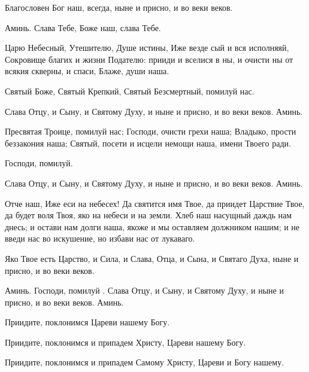 

\label{_content_chasi-tretiy-shestoy}

\begin{mymulticols}
 


 Благословен Бог наш, всегда, ныне и присно, и во веки веков.

 Аминь. Слава Тебе, Боже наш, слава Тебе.



Царю Небесный, Утешителю, Душе истины, Иже везде сый и вся исполняяй, Сокровище благих и жизни Подателю: прииди и вселися в ны, и очисти ны от всякия скверны, и спаси, Блаже, души наша.



Святый Боже, Святый Крепкий, Святый Безсмертный, помилуй нас.

Слава Отцу, и Сыну, и Святому Духу, и ныне и присно, и во веки веков. Аминь.



Пресвятая Троице, помилуй нас; Господи, очисти грехи наша; Владыко, прости беззакония наша; Святый, посети и исцели немощи наша, имени Твоего ради.



Господи, помилуй.

Слава Отцу, и Сыну, и Святому Духу, и ныне и присно, и во веки веков. Аминь.

Отче наш, Иже еси на небесех! Да святится имя Твое, да приидет Царствие Твое, да будет воля Твоя, яко на небеси и на земли. Хлеб наш насущный даждь нам днесь; и остави нам долги наша, якоже и мы оставляем должником нашим; и не введи нас во искушение, но избави нас от лукаваго.

 Яко Твое есть Царство, и Сила, и Слава, Отца, и Сына, и Святаго Духа, ныне и присно, и во веки веков.

 Аминь. Господи, помилуй . Слава Отцу, и Сыну, и Святому Духу, и ныне и присно, и во веки веков. Аминь.

Приидите, поклонимся Цареви нашему Богу.

Приидите, поклонимся и припадем Христу, Цареви нашему Богу.

Приидите, поклонимся и припадем Самому Христу, Цареви и Богу нашему.




\end{mymulticols}
